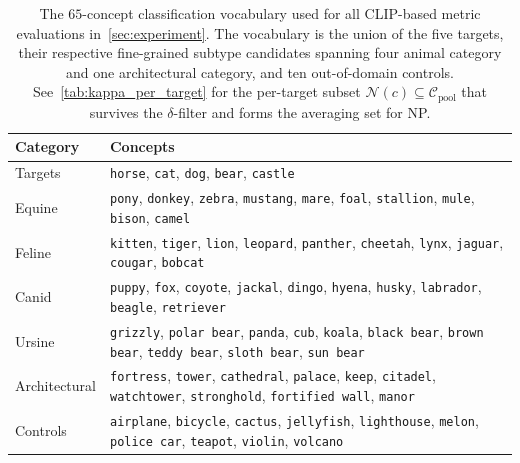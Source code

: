 \begin{table}[h]
\centering
\small
\begin{tabular}{p{3.2cm} p{10cm}}
\toprule
Category & Concepts \\
\midrule
Targets & \texttt{horse}, \texttt{cat}, \texttt{dog}, \texttt{bear}, \texttt{castle} \\
Equine  & \texttt{pony}, \texttt{donkey}, \texttt{zebra}, \texttt{mustang}, \texttt{mare}, \texttt{foal}, \texttt{stallion}, \texttt{mule}, \texttt{bison}, \texttt{camel} \\
Feline  & \texttt{kitten}, \texttt{tiger}, \texttt{lion}, \texttt{leopard}, \texttt{panther}, \texttt{cheetah}, \texttt{lynx}, \texttt{jaguar}, \texttt{cougar}, \texttt{bobcat} \\
Canid  & \texttt{puppy}, \texttt{fox}, \texttt{coyote}, \texttt{jackal}, \texttt{dingo}, \texttt{hyena}, \texttt{husky}, \texttt{labrador}, \texttt{beagle}, \texttt{retriever} \\
Ursine & \texttt{grizzly}, \texttt{polar bear}, \texttt{panda}, \texttt{cub}, \texttt{koala}, \texttt{black bear}, \texttt{brown bear}, \texttt{teddy bear}, \texttt{sloth bear}, \texttt{sun bear} \\
Architectural  & \texttt{fortress}, \texttt{tower}, \texttt{cathedral}, \texttt{palace}, \texttt{keep}, \texttt{citadel}, \texttt{watchtower}, \texttt{stronghold}, \texttt{fortified wall}, \texttt{manor} \\
Controls  & \texttt{airplane}, \texttt{bicycle}, \texttt{cactus}, \texttt{jellyfish}, \texttt{lighthouse}, \texttt{melon}, \texttt{police car}, \texttt{teapot}, \texttt{violin}, \texttt{volcano} \\
\bottomrule
\end{tabular}
\caption{The $65$-concept classification vocabulary used for all CLIP-based metric evaluations in~\cref{sec:experiment}. The vocabulary is the union of the five targets, their respective fine-grained subtype candidates spanning four animal category and one architectural category, and ten out-of-domain controls. See~\cref{tab:kappa_per_target} for the per-target subset $\mathcal{N}(c) \subseteq \mathcal{C}_{\mathrm{pool}}$ that survives the $\delta$-filter and forms the averaging set for NP.}
\label{tab:vocab}
\end{table}
